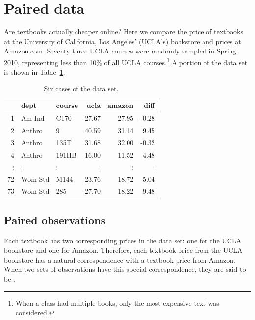 




\section[Paired data]{Paired data ~}
\label{pairedData}


Are textbooks actually cheaper online? Here we compare the price of textbooks at the University of California, Los Angeles' (UCLA's) bookstore and prices at Amazon.com. Seventy-three UCLA courses were randomly sampled in Spring 2010, representing less than 10\% of all UCLA courses.\footnote{When a class had multiple books, only the most expensive text was considered.} A portion of the data set is shown in Table~\ref{textbooksDF}.

\begin{table}[h]
\centering
\begin{tabular}{rllrrr}
  \hline
 & dept & course & ucla & amazon & diff \\ 
  \hline
1 & Am Ind &  C170 & 27.67 & 27.95 & -0.28 \\ 
  2 & Anthro & 9 & 40.59 & 31.14 & 9.45 \\ 
  3 & Anthro & 135T & 31.68 & 32.00 & -0.32 \\ 
  4 & Anthro & 191HB & 16.00 & 11.52 & 4.48 \\ 
$\vdots$ & $\vdots$ & $\vdots$ & $\vdots$ & $\vdots$ & $\vdots$ \\
  72 & Wom Std & M144 & 23.76 & 18.72 & 5.04 \\ 
  73 & Wom Std & 285 & 27.70 & 18.22 & 9.48 \\ 
   \hline
\end{tabular}
\caption{Six cases of the  data set.}
\label{textbooksDF}
\end{table}

\subsection{Paired observations}

Each textbook has two corresponding prices in the data set: one for the UCLA bookstore and one for Amazon. Therefore, each textbook price from the UCLA bookstore has a natural correspondence with a textbook price from Amazon. When two sets of observations have this special correspondence, they are said to be .

